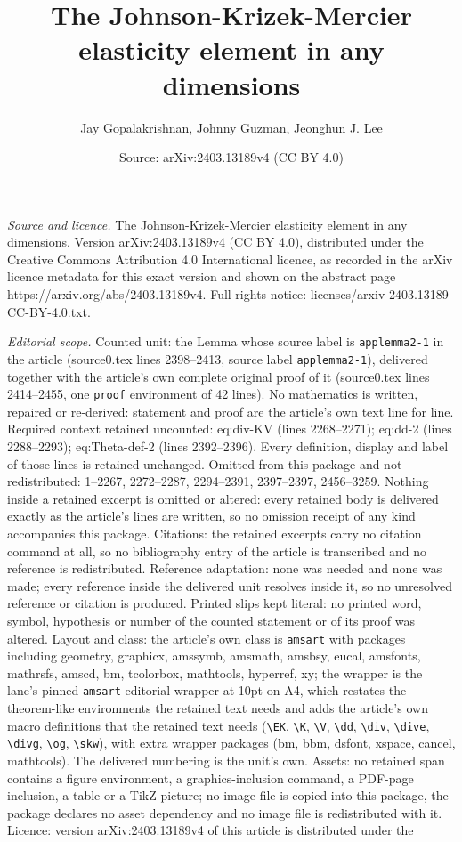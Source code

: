 \documentclass[10pt,a4paper]{amsart}
\title[The Johnson-Krizek-Mercier elasticity element in any dimensi]{The Johnson-Krizek-Mercier elasticity element in any dimensions}
\author{Jay Gopalakrishnan, Johnny Guzman, Jeonghun J. Lee}
\date{Source: arXiv:2403.13189v4 (CC BY 4.0)}
\begin{document}
\maketitle

\noindent\emph{Source and licence.} The Johnson-Krizek-Mercier elasticity element in any dimensions. Version arXiv:2403.13189v4 (CC BY 4.0), distributed under the Creative Commons Attribution 4.0 International licence, as recorded in the arXiv licence metadata for this exact version and shown on the abstract page https://arxiv.org/abs/2403.13189v4. Full rights notice: licenses/arxiv-2403.13189-CC-BY-4.0.txt.\par\smallskip

\noindent\textit{Editorial scope.} Counted unit: the Lemma whose source label is \texttt{applemma2-1} in the article (source0.tex lines 2398--2413, source label \texttt{applemma2-1}), delivered together with the article's own complete original proof of it (source0.tex lines 2414--2455, one \texttt{proof} environment of 42 lines). No mathematics is written, repaired or re-derived: statement and proof are the article's own text line for line. Required context retained uncounted: eq:div-KV (lines 2268--2271); eq:dd-2 (lines 2288--2293); eq:Theta-def-2 (lines 2392--2396). Every definition, display and label of those lines is retained unchanged. Omitted from this package and not redistributed: 1--2267, 2272--2287, 2294--2391, 2397--2397, 2456--3259. Nothing inside a retained excerpt is omitted or altered: every retained body is delivered exactly as the article's lines are written, so no omission receipt of any kind accompanies this package. Citations: the retained excerpts carry no citation command at all, so no bibliography entry of the article is transcribed and no reference is redistributed. Reference adaptation: none was needed and none was made; every reference inside the delivered unit resolves inside it, so no unresolved reference or citation is produced. Printed slips kept literal: no printed word, symbol, hypothesis or number of the counted statement or of its proof was altered. Layout and class: the article's own class is \texttt{amsart} with packages including geometry, graphicx, amssymb, amsmath, amsbsy, eucal, amsfonts, mathrsfs, amscd, bm, tcolorbox, mathtools, hyperref, xy; the wrapper is the lane's pinned \texttt{amsart} editorial wrapper at 10pt on A4, which restates the theorem-like environments the retained text needs and adds the article's own macro definitions that the retained text needs (\texttt{\textbackslash EK}, \texttt{\textbackslash K}, \texttt{\textbackslash V}, \texttt{\textbackslash dd}, \texttt{\textbackslash div}, \texttt{\textbackslash dive}, \texttt{\textbackslash divg}, \texttt{\textbackslash og}, \texttt{\textbackslash skw}), with extra wrapper packages (bm, bbm, dsfont, xspace, cancel, mathtools). The delivered numbering is the unit's own. Assets: no retained span contains a figure environment, a graphics-inclusion command, a PDF-page inclusion, a table or a TikZ picture; no image file is copied into this package, the package declares no asset dependency and no image file is redistributed with it. Licence: version arXiv:2403.13189v4 of this article is distributed under the 
\end{document}
